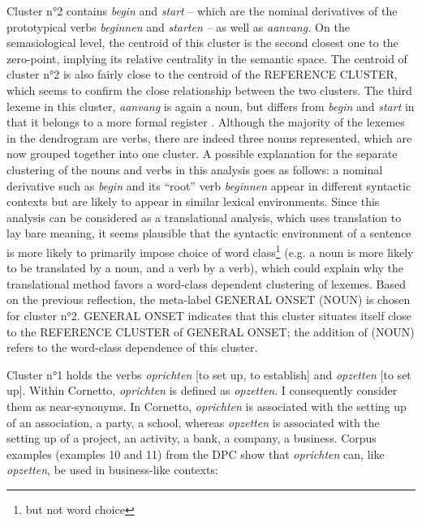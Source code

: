 Cluster n°2 contains \textit{begin} and \textit{start} – which are the nominal derivatives of the prototypical verbs \textit{beginnen} and \textit{starten} \textit{–} as well as \textit{aanvang.} On the semasiological level, the centroid of this cluster is the second closest one to the zero-point, implying its relative centrality in the semantic space. The centroid of cluster n°2 is also fairly close to the centroid of the REFERENCE CLUSTER, which seems to confirm the close relationship between the two clusters. The third lexeme in this cluster, \textit{aanvang} is again a noun, but differs from \textit{begin} and \textit{start} in that it belongs to a more formal register \citep{van_dale_van_2015}. Although the majority of the lexemes in the dendrogram are verbs, there are indeed three nouns represented, which are now grouped together into one cluster. A possible explanation for the separate clustering of the nouns and verbs in this analysis goes as follows: a nominal derivative such as \textit{begin} and its ``root'' verb \textit{beginnen} appear in different syntactic contexts but are likely to appear in similar lexical environments. Since this analysis can be considered as a translational analysis, which uses translation to lay bare meaning, it seems plausible that the syntactic environment of a sentence is more likely to primarily impose choice of word class\footnote{but not word choice} (e.g. a noun is more likely to be translated by a noun, and a verb by a verb), which could explain why the translational method favors a word-class dependent clustering of lexemes. Based on the previous reflection, the meta-label GENERAL ONSET (NOUN) is chosen for cluster n°2. GENERAL ONSET indicates that this cluster situates itself close to the REFERENCE CLUSTER of GENERAL ONSET; the addition of (NOUN) refers to the word-class dependence of this cluster.

Cluster n°1 holds the verbs \textit{oprichten} [to set up, to establish] and \textit{opzetten} [to set up]. Within Cornetto, \textit{oprichten} is defined as \textit{opzetten}. I consequently consider them as near-synonyms. In Cornetto, \textit{oprichten} is associated with the setting up of an association, a party, a school, whereas \textit{opzetten} is associated with the setting up of a project, an activity, a bank, a company, a business. Corpus examples (examples 10 and 11) from the DPC show that \textit{oprichten} can, like \textit{opzetten}, be used in business-like contexts:


